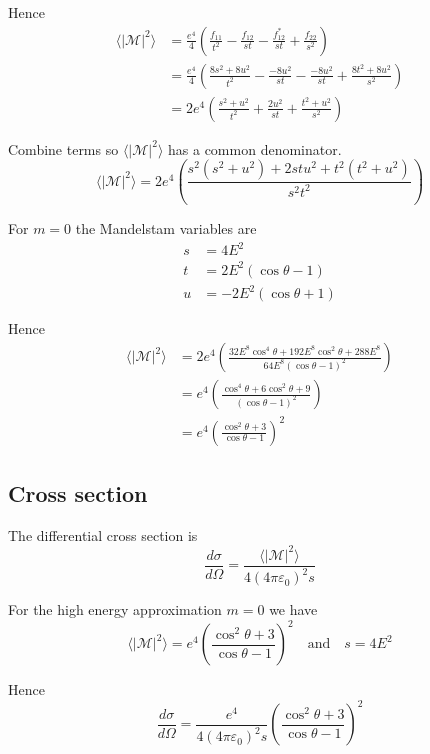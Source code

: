 \documentclass[12pt]{article}
\begin{document}
Hence
\begin{align*}
\langle|\mathcal{M}|^2\rangle
&=\frac{e^4}{4}
\left(
\frac{f_{11}}{t^2} - \frac{f_{12}}{st} -
\frac{f_{12}^*}{st} + \frac{f_{22}}{s^2}
\right)
\\
&=\frac{e^4}{4}
\left(
\frac{8s^2+8u^2}{t^2} - \frac{-8u^2}{st} - \frac{-8u^2}{st} + \frac{8t^2+8u^2}{s^2}
\right)
\\
&=2e^4
\left(
\frac{s^2+u^2}{t^2} + \frac{2u^2}{st} + \frac{t^2+u^2}{s^2}
\right)
\end{align*}

Combine terms so $\langle|\mathcal{M}|^2\rangle$ has a common denominator.
\begin{equation*}
\langle|\mathcal{M}|^2\rangle
=2e^4
\left(\frac{s^2\left(s^2+u^2\right)+2stu^2+t^2\left(t^2+u^2\right)}{s^2t^2}\right)
\end{equation*}

For $m=0$ the Mandelstam variables are
\begin{align*}
s&=4E^2
\\
t&=2E^2(\cos\theta-1)
\\
u&=-2E^2(\cos\theta+1)
\end{align*}

Hence
\begin{align*}
\langle|\mathcal{M}|^2\rangle
&=2e^4
\left(
\frac{32E^8\cos^4\theta+192E^8\cos^2\theta+288E^8}{64E^8(\cos\theta-1)^2}
\right)
\\
&=e^4
\left(
\frac{\cos^4\theta+6\cos^2\theta+9}{(\cos\theta-1)^2}
\right)
\\
&=e^4
\left(
\frac{\cos^2\theta+3}{\cos\theta-1}
\right)^2
\end{align*}

\subsection*{Cross section}
The differential cross section is
\begin{equation*}
\frac{d\sigma}{d\Omega}
=\frac{\langle|\mathcal{M}|^2\rangle}{4(4\pi\varepsilon_0)^2s}
\end{equation*}

For the high energy approximation $m=0$ we have
\begin{equation*}
\langle|\mathcal{M}|^2\rangle=e^4\left(\frac{\cos^2\theta+3}{\cos\theta-1}\right)^2
\quad\text{and}\quad
s=4E^2
\end{equation*}

Hence
\begin{equation*}
\frac{d\sigma}{d\Omega}=\frac{e^4}{4(4\pi\varepsilon_0)^2s}
\left(\frac{\cos^2\theta+3}{\cos\theta-1}\right)^2
\end{equation*}
\end{document}
